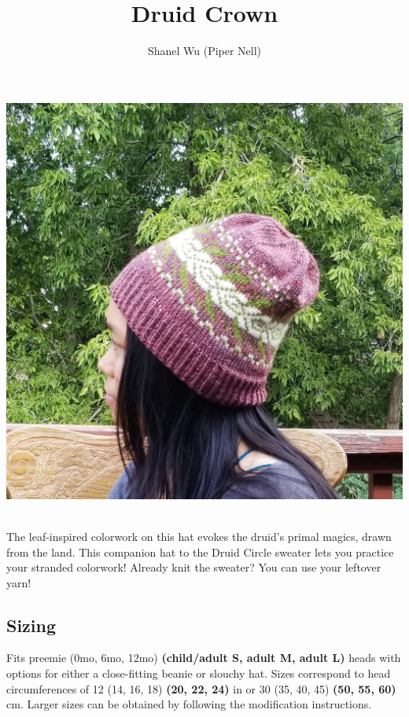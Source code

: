 \documentclass[12pt]{article}
\title{Druid Crown} %
\author{Shanel Wu (Piper Nell)}
\begin{document}
\small


{\selectfont
\HUGE\textbf{\thetitle}
\hspace{\fill} %
\normalsize\theauthor
}

\raggedright
\begin{multicols}{2}
\includegraphics[width=0.9\linewidth]{worn2}

~\\
The leaf-inspired colorwork on this hat evokes the druid's primal magics, drawn from the land. This companion hat to the Druid Circle sweater lets you practice your stranded colorwork! Already knit the sweater? You can use your leftover yarn!

\subsection*{Sizing}

Fits preemie (0mo, 6mo, 12mo) \textbf{(child/adult S, adult M, adult L)} heads with options for either a close-fitting beanie or slouchy hat. 
Sizes correspond to head circumferences of 12 (14, 16, 18) \textbf{(20, 22, 24)} in or 30 (35, 40, 45) \textbf{(50, 55, 60)} cm.
Larger sizes can be obtained by following the modification instructions.


\end{multicols}
\end{document}
